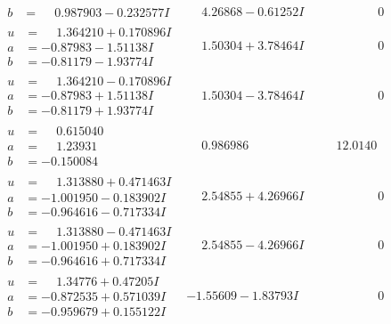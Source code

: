 \documentclass[1p]{elsarticle_modified}
\theoremstyle{definition}
\begin{document}
$$\begin{array}{c|c|c}
\begin{aligned}
b &= \phantom{-}0.987903 - 0.232577 I\end{aligned}
 & \phantom{-}4.26868 - 0.61252 I & \phantom{-0.000000 } 0 \\ \hline\begin{aligned}
u &= \phantom{-}1.364210 + 0.170896 I \\
a &= -0.87983 - 1.51138 I \\
b &= -0.81179 - 1.93774 I\end{aligned}
 & \phantom{-}1.50304 + 3.78464 I & \phantom{-0.000000 } 0 \\ \hline\begin{aligned}
u &= \phantom{-}1.364210 - 0.170896 I \\
a &= -0.87983 + 1.51138 I \\
b &= -0.81179 + 1.93774 I\end{aligned}
 & \phantom{-}1.50304 - 3.78464 I & \phantom{-0.000000 } 0 \\ \hline\begin{aligned}
u &= \phantom{-}0.615040\phantom{ +0.000000I} \\
a &= \phantom{-}1.23931\phantom{ +0.000000I} \\
b &= -0.150084\phantom{ +0.000000I}\end{aligned}
 & \phantom{-}0.986986\phantom{ +0.000000I} & \phantom{-}12.0140\phantom{ +0.000000I} \\ \hline\begin{aligned}
u &= \phantom{-}1.313880 + 0.471463 I \\
a &= -1.001950 - 0.183902 I \\
b &= -0.964616 - 0.717334 I\end{aligned}
 & \phantom{-}2.54855 + 4.26966 I & \phantom{-0.000000 } 0 \\ \hline\begin{aligned}
u &= \phantom{-}1.313880 - 0.471463 I \\
a &= -1.001950 + 0.183902 I \\
b &= -0.964616 + 0.717334 I\end{aligned}
 & \phantom{-}2.54855 - 4.26966 I & \phantom{-0.000000 } 0 \\ \hline\begin{aligned}
u &= \phantom{-}1.34776 + 0.47205 I \\
a &= -0.872535 + 0.571039 I \\
b &= -0.959679 + 0.155122 I\end{aligned}
 & -1.55609 - 1.83793 I & \phantom{-0.000000 } 0 \\ \hline\begin{aligned}

\end{aligned}
\end{array}$$
\end{document}
